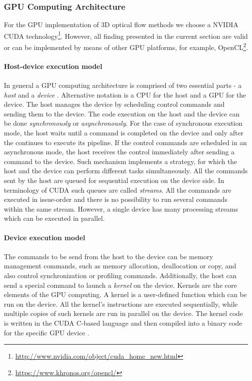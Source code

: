 \subsubsection{GPU Computing Architecture}
For the GPU implementation of 3D optical flow methods we choose a NVIDIA CUDA technology\footnote{\url{http://www.nvidia.com/object/cuda_home_new.html}}. However, all finding presented in the current section are valid or can be implemented by means of other GPU platforms, for example, OpenCL\footnote{\url{https://www.khronos.org/opencl/}}.
\\
\\
\textbf{Host-device execution model}
\\
\\
In general a GPU computing architecture is comprised of two essential parts - a \textit{host} and a \textit{device} \cite{nvidiatoolkit}. Alternative notation is a CPU for the host and a GPU for the device. The host manages the device by scheduling control commands and sending them to the device. The code execution on the host and the device can be done \textit{synchronously} or \textit{asynchronously}. For the case of synchronous execution mode, the host waits until a command is completed on the device and only after the continues to execute its pipeline. If the control commands are scheduled in an asynchronous mode, the host receives the control immediately after sending a command to the device. Such mechanism implements a strategy, for which the host and the device can perform different tasks simultaneously. All the commands sent by the host are queued for sequential execution on the device side. In terminology of CUDA such queues are called \textit{streams}. All the commands are executed in issue-order and there is no possibility to run several commands within the same stream. However, a single device has many processing streams which can be executed in parallel. 
\\
\\
\textbf{Device execution model}
\\
\\
The commands to be send from the host to the device can be memory management commands, such as memory allocation, deallocation or copy, and also control synchronization or profiling commands. Additionally, the host can send a special command to launch a \textit{kernel} on the device. Kernels are the core elements of the GPU computing.  A kernel is a user-defined function which can be run on the device. All the kernel's instructions are executed sequentially, while multiple copies of such kernels are run in parallel on the device. The kernel code is written in the CUDA C-based language and then compiled into a binary code for the specific GPU device \cite{nvidiatoolkit}.

